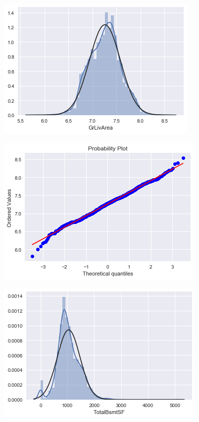 \documentclass{article}
\begin{document}
			\begin{figure}[H]
				\centering
				\includegraphics[scale=0.8]{../img/grlivearea_norm_after_1}
				\caption{}
			\end{figure}
			
			\begin{figure}[H]
				\centering
				\includegraphics[scale=0.8]{../img/grlivearea_norm_after_2}
				\caption{}
			\end{figure}
			
			\begin{figure}[H]
				\centering
				\includegraphics[scale=0.8]{../img/totalbsmtsf_norm_1}
				\caption{}
			\end{figure}
			
\end{document}
